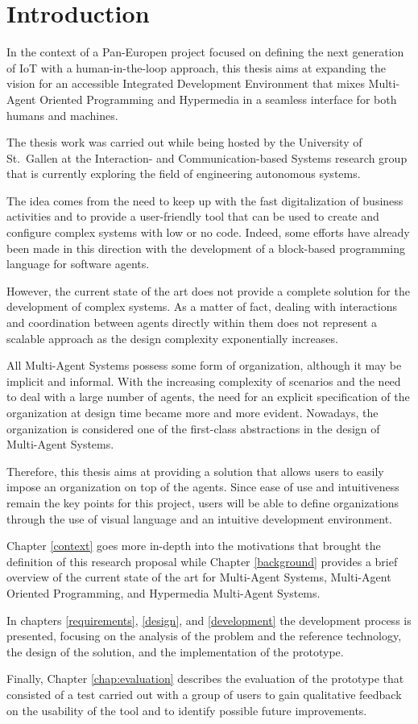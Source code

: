 \chapter{Introduction}

In the context of a Pan-Europen project focused on defining the next generation of IoT with a human-in-the-loop approach, this thesis aims at expanding the vision for an accessible Integrated Development Environment that mixes Multi-Agent Oriented Programming and Hypermedia in a seamless interface for both humans and machines.

The thesis work was carried out while being hosted by the University of St.\ Gallen at the Interaction- and Communication-based Systems research group that is currently exploring the field of engineering autonomous systems.

The idea comes from the need to keep up with the fast digitalization of business activities and to provide a user-friendly tool that can be used to create and configure complex systems with low or no code.
Indeed, some efforts have already been made in this direction with the development of a block-based programming language for software agents.

However, the current state of the art does not provide a complete solution for the development of complex systems.
As a matter of fact, dealing with interactions and coordination between agents directly within them does not represent a scalable approach as the design complexity exponentially increases.

All Multi-Agent Systems possess some form of organization, although it may be implicit and informal.
With the increasing complexity of scenarios and the need to deal with a large number of agents, the need for an explicit specification of the organization at design time became more and more evident.
Nowadays, the organization is considered one of the first-class abstractions in the design of Multi-Agent Systems.

Therefore, this thesis aims at providing a solution that allows users to easily impose an organization on top of the agents.
Since ease of use and intuitiveness remain the key points for this project, users will be able to define organizations through the use of visual language and an intuitive development environment.

Chapter \ref{context} goes more in-depth into the motivations that brought the definition of this research proposal while Chapter \ref{background} provides a brief overview of the current state of the art for Multi-Agent Systems, Multi-Agent Oriented Programming, and Hypermedia Multi-Agent Systems.

In chapters \ref{requirements}, \ref{design}, and \ref{development} the development process is presented, focusing on the analysis of the problem and the reference technology, the design of the solution, and the implementation of the prototype.

Finally, Chapter \ref{chap:evaluation} describes the evaluation of the prototype that consisted of a test carried out with a group of users to gain qualitative feedback on the usability of the tool and to identify possible future improvements.
